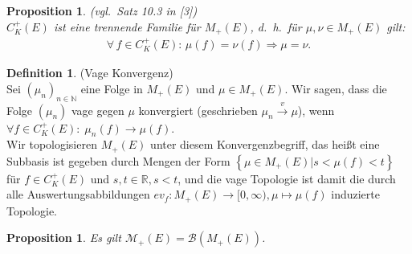 \documentclass[twoside]{article}
\newtheorem{proposition}[theorem]{Proposition}
\theoremstyle{definition}
\newtheorem{definition}[theorem]{Definition}
\begin{document}
\begin{proposition} (vgl.\ Satz 10.3 in [3])\\
$C_K^+(E)$ ist eine trennende Familie für $M_+(E)$, d.\ h.\ für $\mu, \nu \in M_+(E)$ gilt: 
\begin{align}
\forall \, f \in C_K^+(E) : \, \mu(f) = \nu(f) \Longrightarrow \mu = \nu.
\end{align}
\end{proposition}

\begin{definition} 
(Vage Konvergenz)\\
Sei $(\mu_n)_{n \in \mathbb{N}}$ eine Folge in $M_+(E)$ und $\mu \in M_+(E)$. Wir sagen, dass die Folge $(\mu_n)$ vage gegen $\mu$ konvergiert (geschrieben $\mu_n \xrightarrow{v} \mu$), wenn
$
\forall f \in C_K^+(E): \; \mu_n(f) \xrightarrow{} \mu(f)
$.\\
Wir topologisieren $M_+(E)$ unter diesem Konvergenzbegriff, das heißt eine Subbasis ist gegeben durch Mengen der Form $\left\{\mu \in M_+(E) | s < \mu(f) < t \right\}$ für $f \in C_K^+(E)$ und $s,t \in \mathbb{R}, s < t$, und die vage Topologie ist damit die durch alle Auswertungsabbildungen $ev_f:M_+(E) \to [0,\infty), \mu \mapsto \mu(f)$ induzierte Topologie.
\end{definition}

\begin{proposition}
Es gilt $\mathcal{M}_+(E) = \mathcal{B}(M_+(E))$.
\end{proposition}
\end{document}
